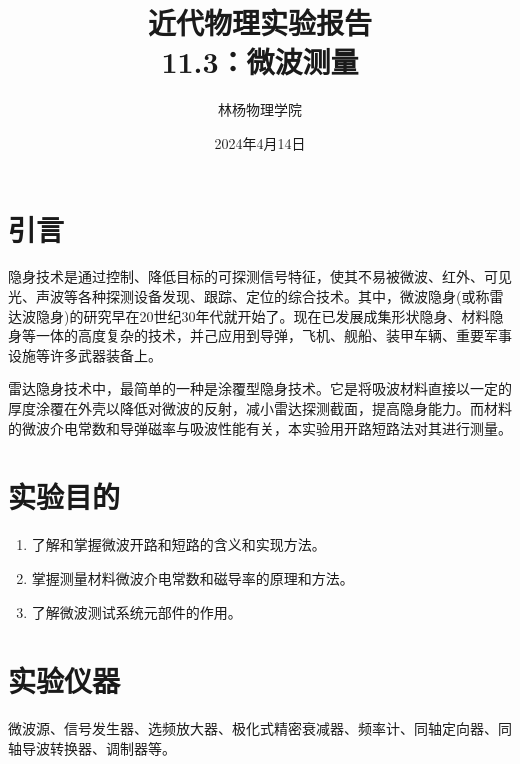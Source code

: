 \documentclass[a4paper]{article}
\title{\Huge 近代物理实验报告\\\huge 11.3：微波测量}
\author{林杨\quad 211840092\quad 物理学院}
\date{2024年4月14日}
\begin{document}
\maketitle

\def\th{\text{th}}
\def\e{\text{e}}



\section{引言}
隐身技术是通过控制、降低目标的可探测信号特征，使其不易被微波、红外、可见光、声波等各种探测设备发现、跟踪、定位的综合技术。其中，微波隐身(或称雷达波隐身)的研究早在20世纪30年代就开始了。现在已发展成集形状隐身、材料隐身等一体的高度复杂的技术，并己应用到导弹，飞机、舰船、装甲车辆、重要军事设施等许多武器装备上。

雷达隐身技术中，最简单的一种是涂覆型隐身技术。它是将吸波材料直接以一定的厚度涂覆在外壳以降低对微波的反射，减小雷达探测截面，提高隐身能力。而材料的微波介电常数和导弹磁率与吸波性能有关，本实验用开路短路法对其进行测量。

\section{实验目的}
\begin{enumerate}
	\item 了解和掌握微波开路和短路的含义和实现方法。
	\item 掌握测量材料微波介电常数和磁导率的原理和方法。
	\item 了解微波测试系统元部件的作用。
\end{enumerate}

\section{实验仪器}
微波源、信号发生器、选频放大器、极化式精密衰减器、频率计、同轴定向器、同轴导波转换器、调制器等。
\end{document}
